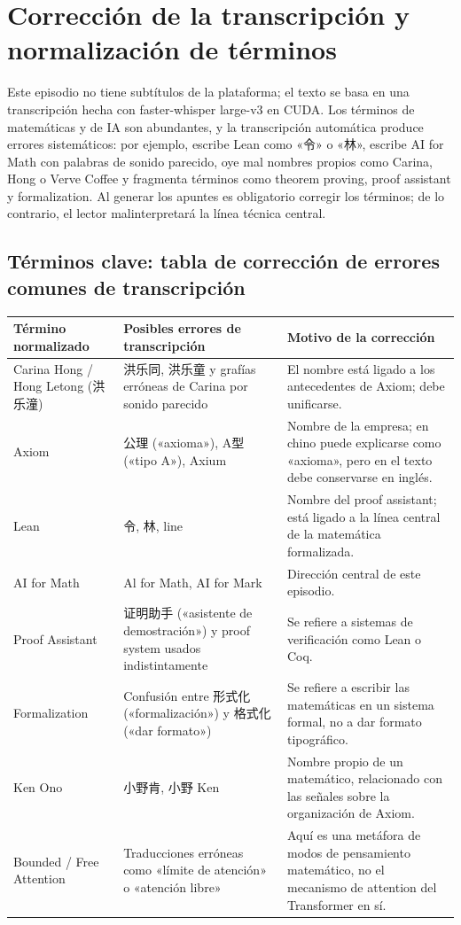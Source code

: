\section{Corrección de la transcripción y normalización de términos}

Este episodio no tiene subtítulos de la plataforma; el texto se basa en una transcripción hecha con faster-whisper large-v3 en CUDA. Los términos de matemáticas y de IA son abundantes, y la transcripción automática produce errores sistemáticos: por ejemplo, escribe Lean como «令» o «林», escribe AI for Math con palabras de sonido parecido, oye mal nombres propios como Carina, Hong o Verve Coffee y fragmenta términos como theorem proving, proof assistant y formalization. Al generar los apuntes es obligatorio corregir los términos; de lo contrario, el lector malinterpretará la línea técnica central.

\subsection{Términos clave: tabla de corrección de errores comunes de transcripción}

\noindent\begin{longtable}{p{}p{}p{}}
\toprule
Término normalizado & Posibles errores de transcripción & Motivo de la corrección \\
\midrule
Carina Hong / Hong Letong (洪乐潼) & 洪乐同, 洪乐童 y grafías erróneas de Carina por sonido parecido & El nombre está ligado a los antecedentes de Axiom; debe unificarse. \\
Axiom & 公理 («axioma»), A型 («tipo A»), Axium & Nombre de la empresa; en chino puede explicarse como «axioma», pero en el texto debe conservarse en inglés. \\
Lean & 令, 林, line & Nombre del proof assistant; está ligado a la línea central de la matemática formalizada. \\
AI for Math & Al for Math, AI for Mark & Dirección central de este episodio. \\
Proof Assistant & 证明助手 («asistente de demostración») y proof system usados indistintamente & Se refiere a sistemas de verificación como Lean o Coq. \\
Formalization & Confusión entre 形式化 («formalización») y 格式化 («dar formato») & Se refiere a escribir las matemáticas en un sistema formal, no a dar formato tipográfico. \\
Ken Ono & 小野肯, 小野 Ken & Nombre propio de un matemático, relacionado con las señales sobre la organización de Axiom. \\
Bounded / Free Attention & Traducciones erróneas como «límite de atención» o «atención libre» & Aquí es una metáfora de modos de pensamiento matemático, no el mecanismo de attention del Transformer en sí. \\
\bottomrule
\end{longtable}


